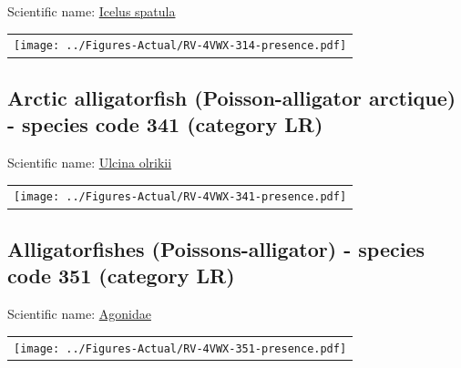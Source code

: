 \documentclass[12pt]{article}\usepackage[]{graphicx}\usepackage[]{color}
\begin{document}
Scientific name: \href{http://www.marinespecies.org/aphia.php?p=taxdetails\&id=127200}{Icelus spatula} \newline
\begin{minipage}{1.0\textwidth}
 \begin{tabular}{c}
\texttt{[image: ../Figures-Actual/RV-4VWX-314-presence.pdf]} \\ 
\end{tabular} 
\end{minipage}
\clearpage

\renewcommand\thefigure{\thesubsection\Alph{figure}}

\setcounter{figure}{0}

\hypertarget{sec:341}{%
\subsection{Arctic alligatorfish (Poisson-alligator arctique) - species code 341 (category LR)}\label{sec:341}}

  


Scientific name: \href{http://www.marinespecies.org/aphia.php?p=taxdetails\&id=274356}{Ulcina olrikii} \newline
\begin{minipage}{1.0\textwidth}
 \begin{tabular}{c}
\texttt{[image: ../Figures-Actual/RV-4VWX-341-presence.pdf]} \\ 
\end{tabular} 
\end{minipage}
\clearpage

\renewcommand\thefigure{\thesubsection\Alph{figure}}

\setcounter{figure}{0}

\hypertarget{sec:351}{%
\subsection{Alligatorfishes (Poissons-alligator) - species code 351 (category LR)}\label{sec:351}}

  


Scientific name: \href{http://www.marinespecies.org/aphia.php?p=taxdetails\&id=125588}{Agonidae} \newline
\begin{minipage}{1.0\textwidth}
 \begin{tabular}{c}
\texttt{[image: ../Figures-Actual/RV-4VWX-351-presence.pdf]} \\ 
\end{tabular} 
\end{minipage}
\clearpage
\end{document}
